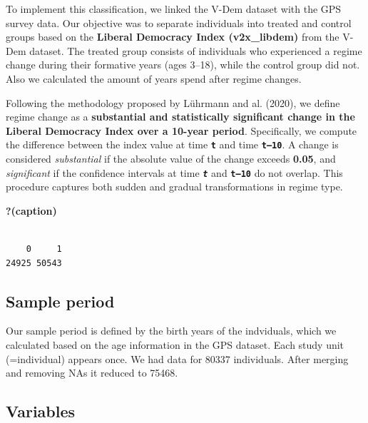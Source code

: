 \documentclass[
  letterpaper,
  DIV=11,
  numbers=noendperiod]{scrartcl}
\begin{document}
To implement this classification, we linked the V-Dem dataset with the
GPS survey data. Our objective was to separate individuals into treated
and control groups based on the \textbf{Liberal Democracy Index
(v2x\_libdem)} from the V-Dem dataset. The treated group consists of
individuals who experienced a regime change during their formative years
(ages 3--18), while the control group did not. Also we calculated the
amount of years spend after regime changes.

Following the methodology proposed by Lührmann and al. (2020), we define
regime change as a \textbf{substantial and statistically significant
change in the Liberal Democracy Index over a 10-year period}.
Specifically, we compute the difference between the index value at time
\textbf{\texttt{t}} and time \textbf{\texttt{t–10}}. A change is
considered \emph{substantial} if the absolute value of the change
exceeds \textbf{0.05}, and \emph{significant} if the confidence
intervals at time \textbf{\emph{\texttt{t}}} and \textbf{\texttt{t–10}}
do not overlap. This procedure captures both sudden and gradual
transformations in regime type.

\begin{table}

\caption{\textbf{?(caption)}}\begin{minipage}[t]{\linewidth}

{\centering 

\begin{verbatim}

    0     1 
24925 50543 
\end{verbatim}

}

\end{minipage}%

\end{table}

\hypertarget{sample-period}{%
\subsection{Sample period}\label{sample-period}}

Our sample period is defined by the birth years of the indviduals, which
we calculated based on the age information in the GPS dataset. Each
study unit (=individual) appears once. We had data for 80337
individuals. After merging and removing NAs it reduced to 75468.

\hypertarget{variables}{%
\subsection{Variables}\label{variables}}
\end{document}

